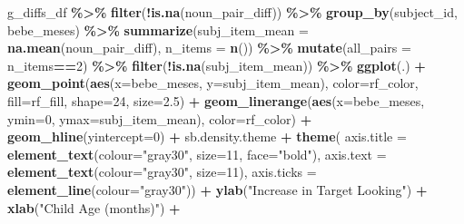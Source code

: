 \documentclass[
  doc,floatsintext]{apa6}
\newenvironment{Shaded}{\begin{snugshade}}{\end{snugshade}}
\newcommand{\AttributeTok}[1]{\textcolor[rgb]{0.13,0.29,0.53}{#1}}
\newcommand{\DecValTok}[1]{\textcolor[rgb]{0.00,0.00,0.81}{#1}}
\newcommand{\FloatTok}[1]{\textcolor[rgb]{0.00,0.00,0.81}{#1}}
\newcommand{\FunctionTok}[1]{\textcolor[rgb]{0.13,0.29,0.53}{\textbf{#1}}}
\newcommand{\NormalTok}[1]{#1}
\newcommand{\SpecialCharTok}[1]{\textcolor[rgb]{0.81,0.36,0.00}{\textbf{#1}}}
\newcommand{\StringTok}[1]{\textcolor[rgb]{0.31,0.60,0.02}{#1}}
\begin{document}
\begin{Shaded}
\begin{Highlighting}[]
\NormalTok{g\_diffs\_df }\SpecialCharTok{\%\textgreater{}\%} 
  \FunctionTok{filter}\NormalTok{(}\SpecialCharTok{!}\FunctionTok{is.na}\NormalTok{(noun\_pair\_diff)) }\SpecialCharTok{\%\textgreater{}\%}
  \FunctionTok{group\_by}\NormalTok{(subject\_id, bebe\_meses) }\SpecialCharTok{\%\textgreater{}\%}
  \FunctionTok{summarize}\NormalTok{(}\AttributeTok{subj\_item\_mean =} \FunctionTok{na.mean}\NormalTok{(noun\_pair\_diff),}
            \AttributeTok{n\_items =} \FunctionTok{n}\NormalTok{()) }\SpecialCharTok{\%\textgreater{}\%}
  \FunctionTok{mutate}\NormalTok{(}\AttributeTok{all\_pairs =}\NormalTok{ n\_items}\SpecialCharTok{==}\DecValTok{2}\NormalTok{) }\SpecialCharTok{\%\textgreater{}\%}
  \FunctionTok{filter}\NormalTok{(}\SpecialCharTok{!}\FunctionTok{is.na}\NormalTok{(subj\_item\_mean)) }\SpecialCharTok{\%\textgreater{}\%}
\FunctionTok{ggplot}\NormalTok{(.) }\SpecialCharTok{+}
  \FunctionTok{geom\_point}\NormalTok{(}\FunctionTok{aes}\NormalTok{(}\AttributeTok{x=}\NormalTok{bebe\_meses, }\AttributeTok{y=}\NormalTok{subj\_item\_mean), }
             \AttributeTok{color=}\NormalTok{rf\_color, }\AttributeTok{fill=}\NormalTok{rf\_fill, }
             \AttributeTok{shape=}\DecValTok{24}\NormalTok{, }\AttributeTok{size=}\FloatTok{2.5}\NormalTok{) }\SpecialCharTok{+} 
  \FunctionTok{geom\_linerange}\NormalTok{(}\FunctionTok{aes}\NormalTok{(}\AttributeTok{x=}\NormalTok{bebe\_meses, }\AttributeTok{ymin=}\DecValTok{0}\NormalTok{, }\AttributeTok{ymax=}\NormalTok{subj\_item\_mean),}
                 \AttributeTok{color=}\NormalTok{rf\_color) }\SpecialCharTok{+}
  \FunctionTok{geom\_hline}\NormalTok{(}\AttributeTok{yintercept=}\DecValTok{0}\NormalTok{) }\SpecialCharTok{+}
\NormalTok{  sb.density.theme }\SpecialCharTok{+}
  \FunctionTok{theme}\NormalTok{(}
    \AttributeTok{axis.title =} \FunctionTok{element\_text}\NormalTok{(}\AttributeTok{colour=}\StringTok{"gray30"}\NormalTok{, }\AttributeTok{size=}\DecValTok{11}\NormalTok{, }\AttributeTok{face=}\StringTok{"bold"}\NormalTok{),}
        \AttributeTok{axis.text =} \FunctionTok{element\_text}\NormalTok{(}\AttributeTok{colour=}\StringTok{"gray30"}\NormalTok{, }\AttributeTok{size=}\DecValTok{11}\NormalTok{),}
        \AttributeTok{axis.ticks =} \FunctionTok{element\_line}\NormalTok{(}\AttributeTok{colour=}\StringTok{"gray30"}\NormalTok{)) }\SpecialCharTok{+}
  \FunctionTok{ylab}\NormalTok{(}\StringTok{"Increase in Target Looking"}\NormalTok{) }\SpecialCharTok{+}
  \FunctionTok{xlab}\NormalTok{(}\StringTok{"Child Age (months)"}\NormalTok{) }\SpecialCharTok{+}

\end{Highlighting}
\end{Shaded}
\end{document}
